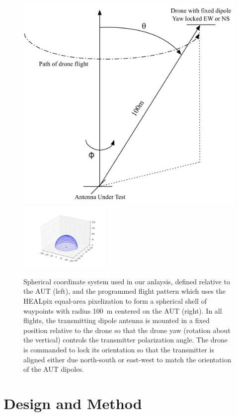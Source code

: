 \documentclass[preprint2,numberedappendix,tighten,twocolappendix]{aastex6}
\begin{document}
\begin{figure}[htb]
\begin{center}
\includegraphics[width=0.6\columnwidth]{figures/ECHO_flight_diagram.png}
\includegraphics[width=0.39\textwidth]{figures/ECHO_flight_path.png}
\caption{Spherical coordinate system used in our anlaysis, defined relative to the AUT (left), and the programmed flight pattern which uses the HEALpix equal-area pixelization to form a spherical shell of waypoints with radius 100~m centered on the AUT (right). In all flights, the transmitting dipole antenna is mounted in a fixed position relative to the drone so that the drone yaw (rotation about the vertical) controls the transmitter polarization angle.  The drone is commanded to lock its orientation so that the transmitter is aligned either due north-south or east-west to match the orientation of the AUT dipoles. \label{fig:fligh_path}}
\end{center}
\end{figure}

\section{Design and Method}
\label{sec:design}
\end{document}

